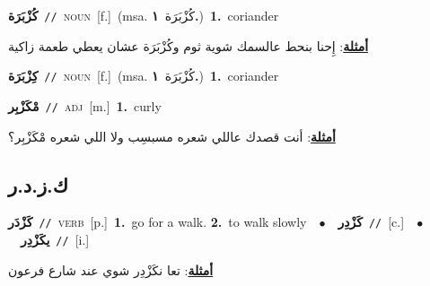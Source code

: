\documentclass[10pt,a4paper,twoside]{article} %
\begin{document}
\begin{multicols}{2}
{\setlength\topsep{0pt}\textbf{\foreignlanguage{arabic}{كُزْبَرَة}}\ {\color{gray}\texttt{//}\color{black}}\ \textsc{noun}\ [f.]\ \color{gray}(msa. \foreignlanguage{arabic}{كُزْبَرَة}~\foreignlanguage{arabic}{\textbf{١.}})\color{black}\ \textbf{1.}~coriander\  \begin{flushright}\color{gray}\foreignlanguage{arabic}{\textbf{\underline{\foreignlanguage{arabic}{أمثلة}}}: إِحنا بنحط عالسمك شوية ثوم وكُزْبَرَة عشان يعطي طعمة زاكية}\end{flushright}\color{black}} \vspace{2mm}

{\setlength\topsep{0pt}\textbf{\foreignlanguage{arabic}{كِزْبَرَة}}\ {\color{gray}\texttt{//}\color{black}}\ \textsc{noun}\ [f.]\ \color{gray}(msa. \foreignlanguage{arabic}{كُزْبَرَة}~\foreignlanguage{arabic}{\textbf{١.}})\color{black}\ \textbf{1.}~coriander\ } \vspace{2mm}

{\setlength\topsep{0pt}\textbf{\foreignlanguage{arabic}{مْكَزْبِر}}\ {\color{gray}\texttt{//}\color{black}}\ \textsc{adj}\ [m.]\ \textbf{1.}~curly\  \begin{flushright}\color{gray}\foreignlanguage{arabic}{\textbf{\underline{\foreignlanguage{arabic}{أمثلة}}}: أنت قصدك عاللي شعره مسبسِب ولا اللي شعره مْكَزْبِر؟}\end{flushright}\color{black}} \vspace{2mm}

\vspace{-3mm}
\subsection*{\color{blue}\foreignlanguage{arabic}{ك.ز.د.ر}\color{blue}{}} 

{\setlength\topsep{0pt}\textbf{\foreignlanguage{arabic}{كَزْدَر}}\ {\color{gray}\texttt{//}\color{black}}\ \textsc{verb}\ [p.]\ \textbf{1.}~go for a walk.  \textbf{2.}~to walk slowly\ \ $\bullet$\ \ \setlength\topsep{0pt}\textbf{\foreignlanguage{arabic}{كَزْدِر}}\ {\color{gray}\texttt{//}\color{black}}\ [c.]\ \ $\bullet$\ \ \setlength\topsep{0pt}\textbf{\foreignlanguage{arabic}{يكَزْدِر}}\ {\color{gray}\texttt{//}\color{black}}\ [i.]\  \begin{flushright}\color{gray}\foreignlanguage{arabic}{\textbf{\underline{\foreignlanguage{arabic}{أمثلة}}}: تعا نكَزْدِر شوي عند شارع فرعون}\end{flushright}\color{black}} \vspace{2mm}


\end{multicols}
\end{document}

